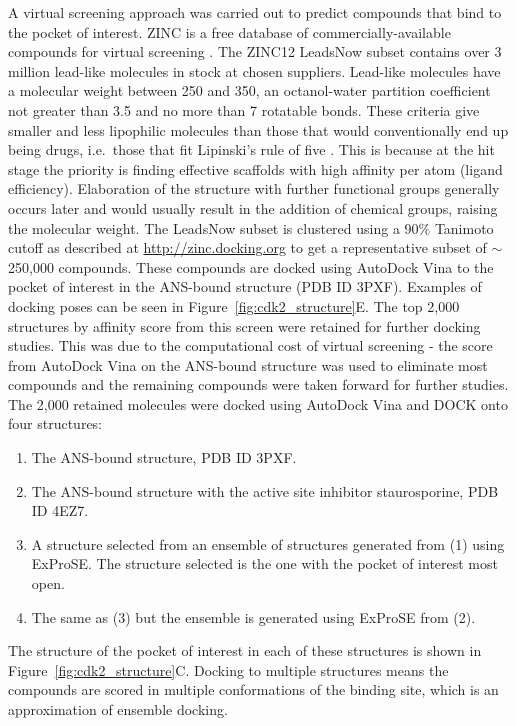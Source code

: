 A virtual screening approach was carried out to predict compounds that bind to the pocket of interest.
ZINC is a free database of commercially-available compounds for virtual screening \cite{Sterling2015}.
The ZINC12 LeadsNow subset contains over 3 million lead-like molecules in stock at chosen suppliers.
Lead-like molecules have a molecular weight between 250 and 350, an octanol-water partition coefficient not greater than 3.5 and no more than 7 rotatable bonds.
These criteria give smaller and less lipophilic molecules than those that would conventionally end up being drugs, i.e.\ those that fit Lipinski's rule of five \cite{Lipinski2001}.
This is because at the hit stage the priority is finding effective scaffolds with high affinity per atom (ligand efficiency).
Elaboration of the structure with further functional groups generally occurs later and would usually result in the addition of chemical groups, raising the molecular weight.
The LeadsNow subset is clustered using a 90\% Tanimoto cutoff as described at \url{http://zinc.docking.org} to get a representative subset of $\sim$250,000 compounds.
These compounds are docked using AutoDock Vina \cite{Trott2010} to the pocket of interest in the ANS-bound structure (PDB ID 3PXF).
Examples of docking poses can be seen in Figure~\ref{fig:cdk2_structure}E.
The top 2,000 structures by affinity score from this screen were retained for further docking studies.
This was due to the computational cost of virtual screening - the score from AutoDock Vina on the ANS-bound structure was used to eliminate most compounds and the remaining compounds were taken forward for further studies.
The 2,000 retained molecules were docked using AutoDock Vina and DOCK \cite{Allen2015} onto four structures:
\begin{enumerate}
\item The ANS-bound structure, PDB ID 3PXF.
\item The ANS-bound structure with the active site inhibitor staurosporine, PDB ID 4EZ7.
\item A structure selected from an ensemble of structures generated from (1) using ExProSE.
The structure selected is the one with the pocket of interest most open.
\item The same as (3) but the ensemble is generated using ExProSE from (2).
\end{enumerate}
The structure of the pocket of interest in each of these structures is shown in Figure~\ref{fig:cdk2_structure}C.
Docking to multiple structures means the compounds are scored in multiple conformations of the binding site, which is an approximation of ensemble docking.
